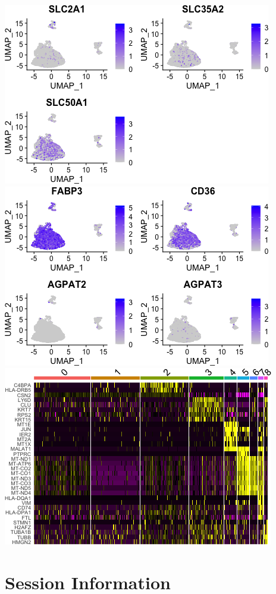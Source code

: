 \documentclass[]{article}
\begin{document}
\includegraphics{figures/feature-analysis-12.png}
\includegraphics{figures/feature-analysis-13.png}
\includegraphics{figures/feature-analysis-14.png}

\hypertarget{session-information}{%
\section{Session Information}\label{session-information}}
\end{document}
